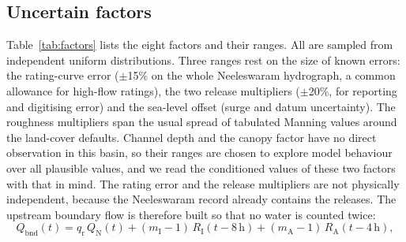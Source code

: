 \documentclass[preprint,12pt,authoryear]{elsarticle}
\begin{document}
\subsection{Uncertain factors}
Table~\ref{tab:factors} lists the eight factors and their ranges. All are sampled from independent uniform distributions. Three ranges rest on the size of known errors: the rating-curve error ($\pm$15\% on the whole Neeleswaram hydrograph, a common allowance for high-flow ratings), the two release multipliers ($\pm$20\%, for reporting and digitising error) and the sea-level offset (surge and datum uncertainty). The roughness multipliers span the usual spread of tabulated Manning values around the land-cover defaults. Channel depth and the canopy factor have no direct observation in this basin, so their ranges are chosen to explore model behaviour over all plausible values, and we read the conditioned values of these two factors with that in mind. The rating error and the release multipliers are not physically independent, because the Neeleswaram record already contains the releases. The upstream boundary flow is therefore built so that no water is counted twice:
\begin{equation}
Q_\mathrm{bnd}(t) = q_\mathrm{r}\,Q_\mathrm{N}(t) + (m_\mathrm{I}-1)\,R_\mathrm{I}(t-8\,\mathrm{h}) + (m_\mathrm{A}-1)\,R_\mathrm{A}(t-4\,\mathrm{h}),
\label{eq:forcing}
\end{equation}
\end{document}
